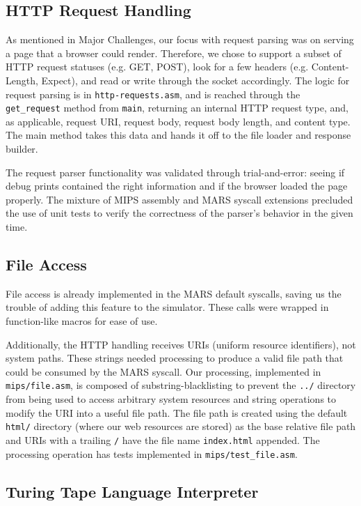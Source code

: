 \documentclass[journal,10pt]{IEEEtran}
\begin{document}
\subsection{HTTP Request Handling}

As mentioned in Major Challenges, our focus with request parsing was on serving
a page that a browser could render. Therefore, we chose to support a subset of
HTTP request statuses (e.g. GET, POST), look for a few headers (e.g.
Content-Length, Expect), and read or write through the socket accordingly. The
logic for request parsing is in \texttt{http-requests.asm}, and is reached
through the \texttt{get\_request} method from \texttt{main}, returning an
internal HTTP request type, and, as applicable, request URI, request body,
request body length, and content type. The main method takes this data and
hands it off to the file loader and response builder.

The request parser functionality was validated through trial-and-error: seeing
if debug prints contained the right information and if the browser loaded the
page properly. The mixture of MIPS assembly and MARS syscall extensions
precluded the use of unit tests to verify the correctness of the parser's
behavior in the given time.

\subsection{File Access}

File access is already implemented in the MARS default syscalls, saving us the
trouble of adding this feature to the simulator. These calls were wrapped in
function-like macros for ease of use.

Additionally, the HTTP handling receives URIs (uniform resource identifiers),
not system paths. These strings needed processing to produce a valid file path
that could be consumed by the MARS syscall. Our processing, implemented in
\texttt{mips/file.asm}, is composed of substring-blacklisting to prevent the
\texttt{../} directory from being used to access arbitrary system resources and
string operations to modify the URI into a useful file path. The file path is
created using the default \texttt{html/} directory (where our web resources are
stored) as the base relative file path and URIs with a trailing \texttt{/} have
the file name \texttt{index.html} appended. The processing operation has tests
implemented in \texttt{mips/test\_file.asm}.

\subsection{Turing Tape Language Interpreter}
\end{document}
